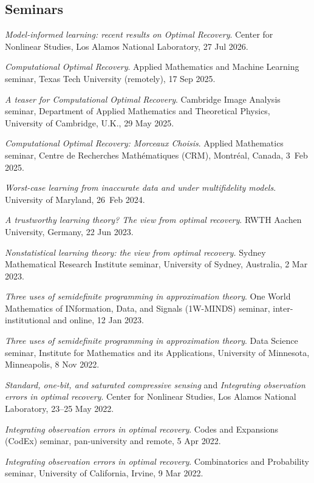 \documentclass[11pt]{article}
\begin{document}
\subsection{Seminars}
\bitemize
\item {\sl Model-informed learning: recent results on Optimal Recovery}.
Center for Nonlinear Studies, Los Alamos National Laboratory, 27 Jul 2026.
\item{\sl Computational Optimal Recovery}.
Applied Mathematics and Machine Learning seminar,
Texas Tech University (remotely), 17 Sep 2025.
\item {\sl A teaser for Computational Optimal Recovery}.
Cambridge Image Analysis seminar,
Department of Applied Mathematics and Theoretical Physics, University of Cambridge, U.K., 29 May 2025. 
\item {\sl Computational Optimal Recovery: Morceaux Choisis}. Applied Mathematics seminar,
Centre de Recherches Math\'ematiques (CRM), Montr\'eal, Canada, 3~Feb 2025.
\item {\sl Worst-case learning from inaccurate data and under multifidelity models}.
University of Maryland, 26~Feb 2024.
\item {\sl A trustworthy learning theory? The view from optimal recovery}.
RWTH Aachen University, Germany, 22 Jun 2023.
\item {\sl Nonstatistical learning theory: the view from optimal recovery.}
Sydney Mathematical Research Institute seminar,
University of Sydney, Australia, 2 Mar 2023.
\item {\sl Three uses of semidefinite programming in approximation theory}.
One World Mathematics of INformation, Data, and Signals (1W-MINDS) seminar,
inter-institutional and online, 12 Jan 2023.
\item {\sl Three uses of semidefinite programming in approximation theory}.
 Data Science seminar,
 Institute for Mathematics and its Applications,
 University of Minnesota, Minneapolis, 8 Nov 2022.
\item {\sl Standard,  one-bit, and saturated compressive sensing} and {\sl Integrating observation errors in optimal recovery}.
Center for Nonlinear Studies, Los Alamos National Laboratory, 23--25 May 2022.
\item {\sl Integrating observation errors in optimal recovery}.  Codes and Expansions (CodEx) seminar,
pan-university and remote, 5 Apr 2022.
\item {\sl Integrating observation errors in optimal recovery}.
Combinatorics and Probability seminar, 
University of California, Irvine, 9 Mar 2022.
\end{document}
